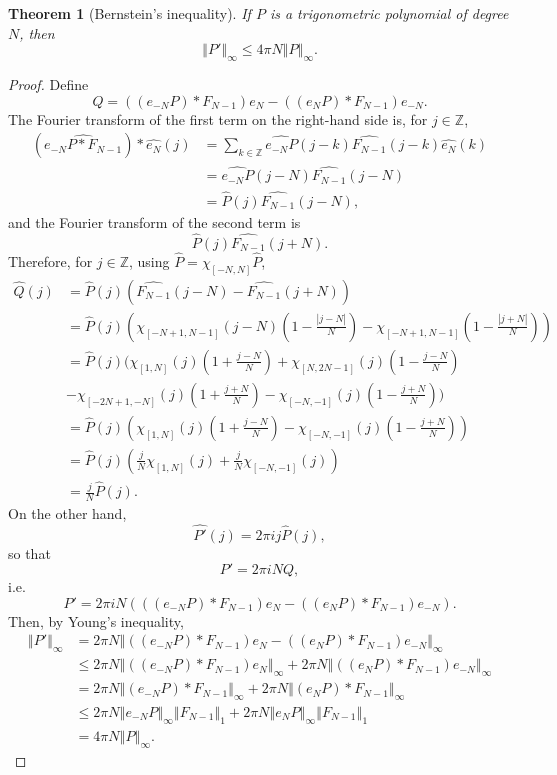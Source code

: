 \documentclass{article}
\newcommand{\norm}[1]{\left\Vert #1 \right\Vert}
\newtheorem{theorem}{Theorem}
\theoremstyle{definition}
\begin{document}
\begin{theorem}[Bernstein's inequality]
If $P$ is a trigonometric polynomial of degree $N$, then
\[
\norm{P'}_\infty \leq 4\pi N\norm{P}_\infty.
\]
\end{theorem}
\begin{proof}
Define
\[
Q=((e_{-N}P)*F_{N-1})e_N-((e_NP)*F_{N-1})e_{-N}.
\]
The Fourier transform of the first term on the right-hand side is, for $j \in \mathbb{Z}$,
\begin{align*}
(\widehat{e_{-N}P * F_{N-1}})*\widehat{e_N}(j)&=\sum_{k \in \mathbb{Z}} \widehat{e_{-N}P}(j-k) \widehat{F_{N-1}}(j-k)\widehat{e_N}(k)\\
&=\widehat{e_{-N}P}(j-N) \widehat{F_{N-1}}(j-N)\\
&=\widehat{P}(j) \widehat{F_{N-1}}(j-N),
\end{align*}
and the Fourier transform of the second term is
\[
\widehat{P}(j) \widehat{F_{N-1}}(j+N).
\]
Therefore, for $j \in \mathbb{Z}$, using $\widehat{P}= \chi_{[-N,N]} \widehat{P}$,
\begin{align*}
\widehat{Q}(j)&=\widehat{P}(j)\left(\widehat{F_{N-1}}(j-N)-\widehat{F_{N-1}}(j+N)\right)\\
&=\widehat{P}(j)\left( \chi_{[-N+1,N-1]}(j-N) \left(1-\frac{|j-N|}{N}\right)
-\chi_{[-N+1,N-1]} \left(1-\frac{|j+N|}{N}\right) \right)\\
&=\widehat{P}(j)\bigg(\chi_{[1,N]}(j)\left(1+\frac{j-N}{N}\right)
+\chi_{[N,2N-1]}(j)\left(1-\frac{j-N}{N}\right)\\
&-\chi_{[-2N+1,-N]}(j)\left(1+\frac{j+N}{N}\right)
-\chi_{[-N,-1]}(j)\left(1-\frac{j+N}{N}\right) \bigg)\\
&=\widehat{P}(j)\left(\chi_{[1,N]}(j)\left(1+\frac{j-N}{N}\right)-
\chi_{[-N,-1]}(j)\left(1-\frac{j+N}{N}\right)\right)\\
&=\widehat{P}(j)\left(\frac{j}{N} \chi_{[1,N]}(j)+
\frac{j}{N} \chi_{[-N,-1]}(j)\right)\\
&=\frac{j}{N} \widehat{P}(j).
\end{align*}
On the other hand,
\[
\widehat{P'}(j) = 2\pi i j \widehat{P}(j),
\]
so that
\[
P'=2\pi iNQ,
\]
i.e.
\[
P'=2\pi iN( ((e_{-N}P)*F_{N-1})e_N-((e_NP)*F_{N-1})e_{-N}).
\]
Then, by Young's inequality,
\begin{align*}
\norm{P'}_\infty&=2\pi N \norm{((e_{-N}P)*F_{N-1})e_N-((e_NP)*F_{N-1})e_{-N}}_\infty\\
&\leq 2\pi N \norm{((e_{-N}P)*F_{N-1})e_N}_\infty
+2\pi N\norm{((e_NP)*F_{N-1})e_{-N}}_\infty\\
&= 2\pi N \norm{(e_{-N}P)*F_{N-1}}_\infty
+2\pi N \norm{(e_NP)*F_{N-1}}_\infty\\
&\leq 2\pi N \norm{e_{-N} P}_\infty \norm{F_{N-1}}_1 + 2\pi N \norm{e_NP}_\infty \norm{F_{N-1}}_1\\
&=4\pi N \norm{P}_\infty.
\end{align*}
\end{proof}






 
 
\end{document}
